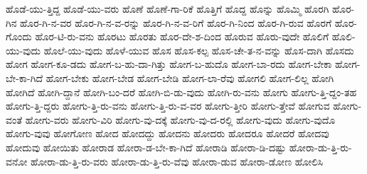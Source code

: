 {ಹೊಡೆ-ಯು-ತ್ತಿದ್ದ
ಹೊಡೆ-ಯು-ವರು
ಹೊಣೆ
ಹೊಣೆ-ಗಾ-ರಿಕೆ
ಹೊತ್ತಿಗೆ
ಹೊದ್ದ
ಹೊನ್ನು
ಹೊಮ್ಮಿ
ಹೊರಗಿ
ಹೊರ-ಗಿನ
ಹೊರ-ಗಿ-ನ-ವರ
ಹೊರ-ಗಿ-ನ-ವ-ರನ್ನು
ಹೊರ-ಗಿ-ನ-ವ-ರಿಗೆ
ಹೊರ-ಗಿ-ನಿಂದ
ಹೊರ-ಗಿ-ರುವ
ಹೊರಗೆ
ಹೊರ-ಗೊಂದು
ಹೊರ-ಟಿ-ರು-ವನು
ಹೊರಟು
ಹೊರತು
ಹೊರ-ದೇ-ಶ-ದಿಂದ
ಹೊರುವ
ಹೊರು-ವುದೇ
ಹೊಲಿಗೆ
ಹೊಲಿ-ಯು-ವುದು
ಹೊಲೆ-ಯು-ವುದು
ಹೊಳೆ-ಯುವ
ಹೊಸ
ಹೊಸ-ಕಲ್ಪ
ಹೊಸ-ಚೇ-ತ-ನ-ವನ್ನು
ಹೊಸ-ದಾಗಿ
ಹೊಸದು
ಹೋಗ
ಹೋಗ-ಕೂ-ಡದು
ಹೋಗ-ಬ-ಹು-ದಾ-ಗಿತ್ತು
ಹೋಗ-ಬ-ಹುದೊ
ಹೋಗ-ಬಾ-ರದು
ಹೋಗ-ಬೇಕಾ
ಹೋಗ-ಬೇ-ಕಾ-ಗಿದೆ
ಹೋಗ-ಬೇಕು
ಹೋಗ-ಬೇಡ
ಹೋಗ-ಬೇಡಿ
ಹೋಗ-ಲಾ-ರೆವು
ಹೋಗಲಿ
ಹೋಗ-ಲಿಲ್ಲ
ಹೋಗಿ
ಹೋಗಿದೆ
ಹೋಗಿ-ದ್ದಾನೆ
ಹೋಗಿ-ಬಂ-ದರೆ
ಹೋಗಿ-ಬಿ-ಡು-ವುದು
ಹೋಗಿ-ರು-ವನು
ಹೋಗು
ಹೋಗು-ತ್ತಿ-ದ್ದಂ-ತಹ
ಹೋಗು-ತ್ತಿ-ದ್ದರು
ಹೋಗು-ತ್ತಿ-ರು-ವನು
ಹೋಗು-ತ್ತಿ-ರು-ವ-ವರ
ಹೋಗು-ತ್ತೀರಿ
ಹೋಗು-ತ್ತೇವೆ
ಹೋಗುವ
ಹೋಗು-ವಂತೆ
ಹೋಗು-ವರು
ಹೋಗು-ವಿರಿ
ಹೋಗು-ವು-ದಕ್ಕೆ
ಹೋಗು-ವು-ದ-ರಲ್ಲಿ
ಹೋಗು-ವುದು
ಹೋಗು-ವುದೊ
ಹೋಗು-ವುವು
ಹೋಗೋಣ
ಹೋದ
ಹೋದದ್ದು
ಹೋದನು
ಹೋದರು
ಹೋದರೂ
ಹೋದರೆ
ಹೋದವು
ಹೋದುವು
ಹೋಯಿತು
ಹೋರಾಡ
ಹೋರಾ-ಡ-ಬೇ-ಕಾ-ಗಿದೆ
ಹೋರಾಡಿ
ಹೋರಾ-ಡಿ-ದಷ್ಟು
ಹೋರಾ-ಡು-ತ್ತಿ-ರು-ವನೋ
ಹೋರಾ-ಡು-ತ್ತಿ-ರು-ವರು
ಹೋರಾ-ಡು-ತ್ತಿ-ರು-ವೆವು
ಹೋರಾ-ಡುವ
ಹೋರಾ-ಡೋಣ
ಹೋಲಿಸಿ
}
